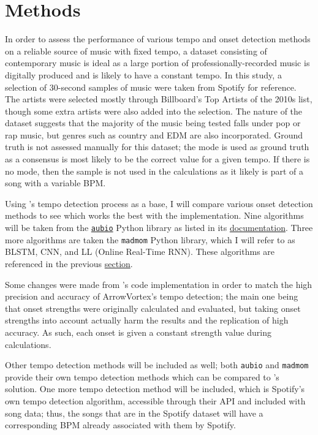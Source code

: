 \documentclass[11pt, oneside]{article}
\begin{document}
\section{Methods}

In order to assess the performance of various tempo and onset detection methods
on a reliable source of music with fixed tempo, a dataset consisting of
contemporary music is ideal as a large portion of professionally-recorded music
is digitally produced and is likely to have a constant tempo. In this study, a
selection of 30-second samples of music were taken from Spotify for reference.
The artists were selected mostly through Billboard's Top Artists of the 2010s
list, though some extra artists were also added into the selection. The nature
of the dataset suggests that the majority of the music being tested falls under
pop or rap music, but genres such as country and EDM are also incorporated.
Ground truth is not assessed manually for this dataset; the mode is used as
ground truth as a consensus is most likely to be the correct value for a given
tempo. If there is no mode, then the sample is not used in the calculations as
it likely is part of a song with a variable BPM.

Using \citeauthor*{bram}'s tempo detection process as a base, I will compare
various onset detection methods to see which works the best with the
implementation. Nine algorithms will be taken from the
\href{https://aubio.org/}{\texttt{aubio}} Python library as listed in its
\href{https://aubio.org/manpages/latest/aubioonset.1.html}{documentation}. Three
more algorithms are taken the \texttt{madmom} Python library, which I will refer
to as BLSTM, CNN, and LL (Online Real-Time RNN). These algorithms are referenced
in the previous \hyperref[sec:background]{section}.

Some changes were made from \citeauthor*{bram}'s code implementation in order to
match the high precision and accuracy of ArrowVortex's tempo detection; the main
one being that onset strengths were originally calculated and evaluated, but
taking onset strengths into account actually harm the results and the
replication of high accuracy. As such, each onset is given a constant strength
value during calculations.

Other tempo detection methods will be included as well; both \texttt{aubio} and
\texttt{madmom} provide their own tempo detection methods which can be compared
to \citeauthor*{bram}'s solution. One more tempo detection method will be
included, which is Spotify’s own tempo detection algorithm, accessible through
their API and included with song data; thus, the songs that are in the Spotify
dataset will have a corresponding BPM already associated with them by Spotify.
\end{document}
